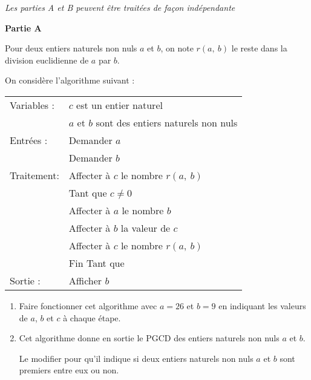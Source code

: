 \documentclass{cornouaille}
\begin{document}
\begin{exercice}

\emph{Les parties A et B peuvent être traitées de façon indépendante}

\medskip

\textbf{Partie A}

\medskip

Pour deux entiers naturels non nuls $a$ et $b$, on note $r(a,~b)$ le reste dans la division euclidienne de $a$ par $b$.

On considère l'algorithme suivant :

\begin{center}
\begin{tabularx}{0.7\linewidth}{|l|X|}\hline
Variables :	& $c$ est un entier naturel\\
			&$a$ et $b$ sont des entiers naturels non nuls\\
Entrées :	&Demander $a$\\
			&Demander $b$\\
Traitement:	&Affecter à $c$ le nombre $r(a,~b)$\\
			&Tant que $c \ne 0$\\
			&\hspace{0.5cm}Affecter à $a$ le nombre $b$\\
			&\hspace{0.5cm}Affecter à $b$ la valeur de $c$\\
			&\hspace{0.5cm}Affecter à $c$ le nombre $r(a,~b)$\\
			&Fin Tant que\\
Sortie :	&Afficher $b$\\ \hline
			\end{tabularx}
			\end{center}

\begin{enumerate}
\item Faire fonctionner cet algorithme avec $a = 26$ et $b = 9$ en indiquant les valeurs de $a$, $b$ et $c$ à chaque étape.
\item Cet algorithme donne en sortie le PGCD des entiers naturels non nuls $a$ et $b$.

Le modifier pour qu'il indique si deux entiers naturels non nuls $a$ et $b$ sont premiers entre
eux ou non.
\end{enumerate}

\bigskip


\end{exercice}
\end{document}
